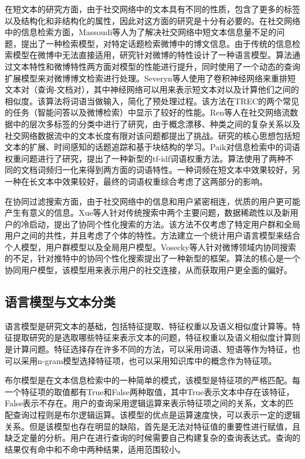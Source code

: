 在短文本的研究方面，由于社交网络中的文本具有不同的性质，包含了更多的标签以及结构化和非结构化的属性，因此对这方面的研究是十分有必要的。在社交网络中的信息检索方面，Massoudi等人为了解决社交网络中短文本信息量不足的问题，提出了一种检索模型，对特定话题检索微博中的博文信息。由于传统的信息检索模型在微博中无法直接适用，研究针对微博的特性设计了一种语言模型。算法通过文本特性和微博特性两方面对模型的性能进行提升，同时使用了一个动态的查询扩展模型来对微博博文检索进行处理。Severyn等人使用了卷积神经网络来重排短文本对（查询-文档对），其中神经网络可以用来表示短文本对以及计算他们之间的相似度。该算法将词语当做输入，简化了预处理过程。该方法在TREC的两个常见的任务（智能问答以及微博检索）中显示了较好的性能。Ren等人在社交网络流数据中的层次多标签的分类中进行了研究，由于概念漂移、种类之间的复杂关系以及社交网络数据流中的文本长度有限对该问题都提出了挑战。研究的核心思想包括短文本的扩展、时间感知的话题追踪和基于块结构的学习。Paik对信息检索中的词语权重问题进行了研究，提出了一种新型的tf-idf词语权重方法。算法使用了两种不同的文档词频归一化来得到两方面的词语特性。一种词频在短文本中效果较好，另一种在长文本中效果较好，最终的词语权重综合考虑了这两部分的影响。

在协同过滤搜索方面，由于社交网络中的信息和用户紧密相连，优质的用户更可能产生有意义的信息。Xue等人针对传统搜索中两个主要问题，数据稀疏性以及新用户的冷启动，提出了协同个性化搜索的方法。该方法不仅考虑了特定用户群和全局用户之间的共性，并且考虑了个体的特性。方法建立一个统计用户语言模型来结合个人模型，用户群模型以及全局用户模型。Vosecky等人针对微博领域内协同搜索的不足，针对推特中的协同个性化搜索提出了一种新型的框架。算法的核心是一个协同用户模型，该模型用来表示用户的社交连接，从而获取用户更全面的偏好。

\subsection{语言模型与文本分类}
\label{subsec1:textClassification}
语言模型是研究文本的基础，包括特征提取、特征权重以及语义相似度计算等。特征提取研究的是选取哪些特征来表示文本的问题，特征权重以及语义相似度计算则是计算问题。特征选择存在许多不同的方法，可以采用词语、短语等作为特征，也可以采用n-gram模型选择特征项，也可以采用知识库中的概念作为特征项。

布尔模型是在文本信息检索中的一种简单的模式，该模型是特征项的严格匹配。每一个特征项的取值都有True和False两种取值，其中True表示文本中存在该特征，False表示不存在。用户的查询采用逻辑运算来表示特征项之间的关系，文本的匹配查询过程则是布尔逻辑运算。该模型的优点是运算速度快，可以表示一定的逻辑关系。但是该模型也存在明显的缺陷，首先是无法对特征值的重要性进行赋值，且缺乏定量的分析。用户在进行查询的时候需要自己构建复杂的查询表达式。查询的结果仅有命中和不命中两种结果，适用范围较小。

